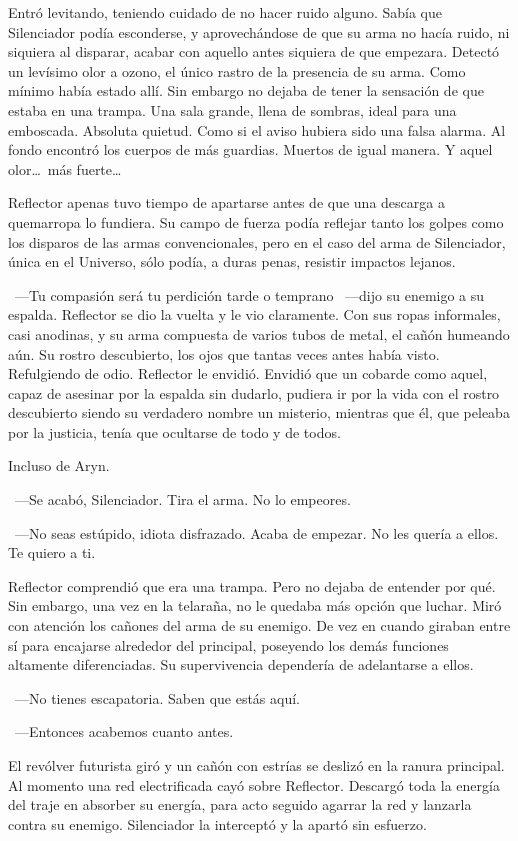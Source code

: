 Entró levitando, teniendo cuidado de no hacer ruido alguno. Sabía que Silenciador podía esconderse, y aprovechándose de que su arma no hacía ruido, ni siquiera al disparar, acabar con aquello antes siquiera de que empezara. Detectó un levísimo olor a ozono, el único rastro de la presencia de su arma. Como mínimo había estado allí. Sin embargo no dejaba de tener la sensación de que estaba en una trampa. Una sala grande, llena de sombras, ideal para una emboscada. Absoluta quietud. Como si el aviso hubiera sido una falsa alarma. Al fondo encontró los cuerpos de más guardias. Muertos de igual manera. Y aquel olor\dots\ más fuerte\dots

Reflector apenas tuvo tiempo de apartarse antes de que una descarga a quemarropa lo fundiera. Su campo de fuerza podía reflejar tanto los golpes como los disparos de las armas convencionales, pero en el caso del arma de Silenciador, única en el Universo, sólo podía, a duras penas, resistir impactos lejanos.

~---Tu compasión será tu perdición tarde o temprano ~---dijo su enemigo a su espalda. Reflector se dio la vuelta y le vio claramente. Con sus ropas informales, casi anodinas, y su arma compuesta de varios tubos de metal, el cañón humeando aún. Su rostro descubierto, los ojos que tantas veces antes había visto. Refulgiendo de odio. Reflector le envidió. Envidió que un cobarde como aquel, capaz de asesinar por la espalda sin dudarlo, pudiera ir por la vida con el rostro descubierto siendo su verdadero nombre un misterio, mientras que él, que peleaba por la justicia, tenía que ocultarse de todo y de todos.

Incluso de Aryn.

~---Se acabó, Silenciador. Tira el arma. No lo empeores.

~---No seas estúpido, idiota disfrazado. Acaba de empezar. No les quería a ellos. Te quiero a ti.

Reflector comprendió que era una trampa. Pero no dejaba de entender por qué. Sin embargo, una vez en la telaraña, no le quedaba más opción que luchar. Miró con atención los cañones del arma de su enemigo. De vez en cuando giraban entre sí para encajarse alrededor del principal, poseyendo los demás funciones altamente diferenciadas. Su supervivencia dependería de adelantarse a ellos.

~---No tienes escapatoria. Saben que estás aquí.

~---Entonces acabemos cuanto antes.

El revólver futurista giró y un cañón con estrías se deslizó en la ranura principal. Al momento una red electrificada cayó sobre Reflector. Descargó toda la energía del traje en absorber su energía, para acto seguido agarrar la red y lanzarla contra su enemigo. Silenciador la interceptó y la apartó sin esfuerzo.

